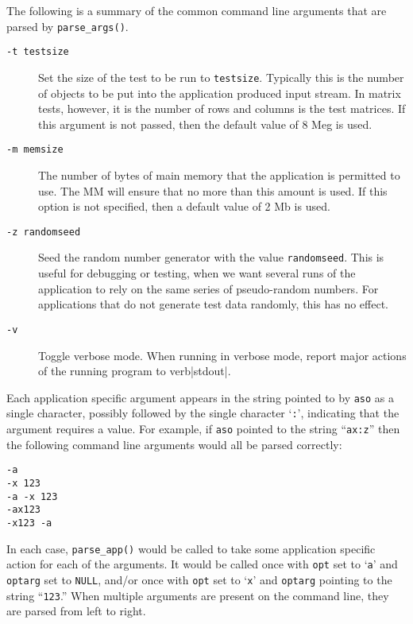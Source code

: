The following is a summary of the common command line arguments that
are parsed by \verb|parse_args()|.
\begin{description}
\item[\verb|-t testsize|]
Set the size of the test to be run to \verb|testsize|.  Typically this
is the number of objects to be put into the application produced input
stream.  In matrix tests, however, it is the number of rows and
columns is the test matrices.  If this argument is not passed, then
the default value of 8 Meg is used.
\item[\verb|-m memsize|]
The number of bytes of main memory that the application is permitted to
use.  The MM will ensure that no more than this amount is
used.  If this option is not specified, then a default value of 2 Mb
is used.
\item[\verb|-z randomseed|]
Seed the random number generator with the value \verb|randomseed|.
This is useful for debugging or testing, when we want several runs of
the application to rely on the same series of pseudo-random numbers.
For applications that do not generate test data randomly, this has no
effect. 
\item[\verb|-v|]
Toggle verbose mode.  When running in verbose mode, report major
actions of the running program to verb|stdout|.
\end{description}

Each application specific argument appears in the string pointed to by
\verb|aso| as a single character, possibly followed by the single
character `\verb|:|', indicating that the argument requires a value.
For example, if \verb|aso| pointed to the string ``\verb|ax:z|'' then the
following command line arguments would all be parsed correctly:
\begin{description}
\item[\verb|-a|]
\item[\verb|-x 123|]
\item[\verb|-a -x 123|]
\item[\verb|-ax123|]
\item[\verb|-x123 -a|]
\end{description}
In each case, \verb|parse_app()| would be called to take some
application specific action for each of the arguments.  It would be
called once with \verb|opt| set to `\verb|a|' and \verb|optarg| set to
\verb|NULL|, and/or once with \verb|opt| set to `\verb|x|' and
\verb|optarg| pointing to the string ``\verb|123|.''  When multiple arguments
are present on the command line, they are parsed from left to right.

